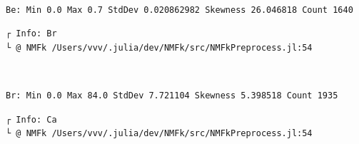 \documentclass[11pt]{article}
\begin{document}
    \begin{center}
    \end{center}
    { \hspace*{\fill} \\}
    
    \begin{Verbatim}[commandchars=\\\{\}]
Be: Min 0.0 Max 0.7 StdDev 0.020862982 Skewness 26.046818 Count 1640
    \end{Verbatim}

    \begin{Verbatim}[commandchars=\\\{\}]
┌ Info: Br
└ @ NMFk /Users/vvv/.julia/dev/NMFk/src/NMFkPreprocess.jl:54
    \end{Verbatim}

    \begin{center}
    \end{center}
    { \hspace*{\fill} \\}
    
    \begin{Verbatim}[commandchars=\\\{\}]
Br: Min 0.0 Max 84.0 StdDev 7.721104 Skewness 5.398518 Count 1935
    \end{Verbatim}

    \begin{Verbatim}[commandchars=\\\{\}]
┌ Info: Ca
└ @ NMFk /Users/vvv/.julia/dev/NMFk/src/NMFkPreprocess.jl:54
    \end{Verbatim}

    \begin{center}
    \end{center}
    { \hspace*{\fill} \\}
    
    \begin{center}
    \end{center}
    { \hspace*{\fill} \\}
    
\end{document}
